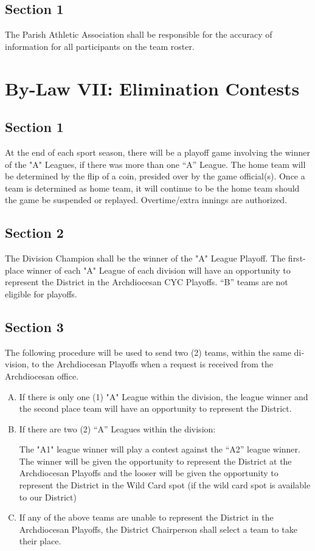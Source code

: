 \documentclass[draft]{memoir}
\begin{document}
\subsection{Section 1}
The Parish Athletic Association shall be responsible for the accuracy of information for all participants on the team roster.

\section{By-Law VII: Elimination Contests}
\subsection{Section 1}
At the end of each sport season, there will be a playoff game involving the win­ner of the "A" Leagues, if there was more than one “A” League.  The home team will be determined by the flip of a coin, pre­sided over by the game official(s).  Once a team is determined as home team, it will continue to be the home team should the game be suspended or replayed.   Overtime/extra innings are authorized.

\subsection{Section 2}
The Division Champion shall be the winner of the "A" League Playoff.  The first-place winner of each "A" League of each division will have an opportunity to represent the District in the Archdiocesan CYC Playoffs. “B” teams are not eligible for playoffs.

\subsection{Section 3}
The following procedure will be used to send two (2) teams, within the same di­vision, to the Archdiocesan Playoffs when a request is received from the Archdiocesan office.

\begin{enumerate}[A.]
    \item If there is only one (1) "A" League within the division, the league winner and the sec­ond place team will have an opportunity to represent the District.
    \item If there are two (2) “A” Leagues within the division:
    
    The "A1" league winner will play a contest against the “A2” league winner. The winner will be given the opportunity to represent the District at the Archdiocesan Playoffs and the looser will be given the opportunity to represent the District in the Wild Card spot (if the wild card spot is available to our District)

    \item If any of the above teams are unable to represent the District in the Archdiocesan Playoffs, the District Chairperson shall select a team to take their place.
\end{enumerate}
\end{document}
